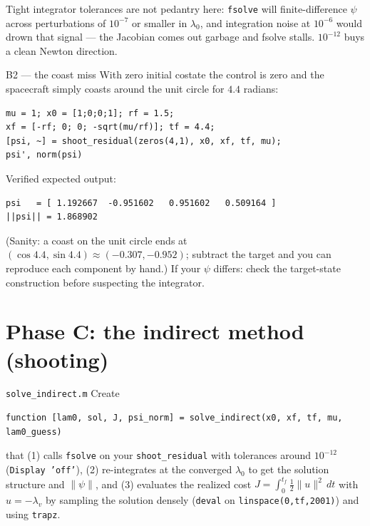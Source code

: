 \documentclass[11pt,letterpaper]{article}
\newcommand{\half}{\tfrac12}
\begin{document}
\begin{hint}
Tight integrator tolerances are not pedantry here: \texttt{fsolve} will
finite-difference $\psi$ across perturbations of $10^{-7}$ or smaller in
$\lambda_0$, and integration noise at $10^{-6}$ would drown that signal ---
the Jacobian comes out garbage and fsolve stalls. $10^{-12}$ buys a clean
Newton direction.
\end{hint}

\begin{checkpoint}{B2 --- the coast miss}
With zero initial costate the control is zero and the spacecraft simply
coasts around the unit circle for $4.4$ radians:
\begin{verbatim}
mu = 1; x0 = [1;0;0;1]; rf = 1.5;
xf = [-rf; 0; 0; -sqrt(mu/rf)]; tf = 4.4;
[psi, ~] = shoot_residual(zeros(4,1), x0, xf, tf, mu);
psi', norm(psi)
\end{verbatim}
Verified expected output:
\begin{verbatim}
psi   = [ 1.192667  -0.951602   0.951602   0.509164 ]
||psi|| = 1.868902
\end{verbatim}
(Sanity: a coast on the unit circle ends at
$(\cos 4.4, \sin 4.4) \approx (-0.307, -0.952)$; subtract the target and you
can reproduce each component by hand.) If your $\psi$ differs: check the
target-state construction before suspecting the integrator.
\end{checkpoint}

\section{Phase C: the indirect method (shooting)}

\begin{exercise}{\texttt{solve\_indirect.m}}
Create
\begin{verbatim}
function [lam0, sol, J, psi_norm] = solve_indirect(x0, xf, tf, mu, lam0_guess)
\end{verbatim}
that (1) calls \texttt{fsolve} on your \texttt{shoot\_residual} with
tolerances around $10^{-12}$ (\texttt{Display 'off'}), (2) re-integrates at
the converged $\lambda_0$ to get the solution structure and
$\|\psi\|$, and (3) evaluates the realized cost
$J = \int_0^{t_f}\half\|u\|^2\,dt$ with $u = -\lambda_v$ by sampling the
solution densely (\texttt{deval} on \texttt{linspace(0,tf,2001)}) and using
\texttt{trapz}.
\end{exercise}
\end{document}

